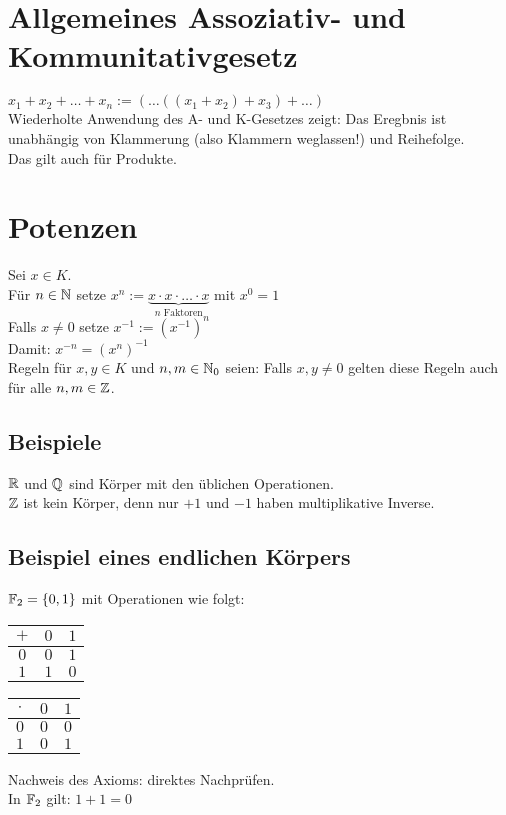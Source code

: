 \fancyhead[R]{}
{}
\section*{Allgemeines Assoziativ- und Kommunitativgesetz}
$x_1+x_2+\hdots+x_n := (\hdots((x_1+x_2)+x_3)+\hdots)$\\
Wiederholte Anwendung des A- und K-Gesetzes zeigt: Das Eregbnis ist unabhängig von Klammerung (also Klammern weglassen!) und Reihefolge.\\
Das gilt auch für Produkte.

\section*{Potenzen}
Sei $x \in K$.\\
Für $n \in \mathbb{N}$ setze $x^n := \underbrace{x \cdot x \cdot \hdots \cdot x}_{n \text{ Faktoren}}$ mit $x^0=1$\\
Falls $x \neq 0$ setze $x^{-1} := (x^{-1})^n$\\
Damit: $x^{-n} = (x^n)^{-1}$\\
Regeln für $x,y \in K$ und $n,m \in \mathbb{N}_0$ seien:
Falls $x,y \neq 0$ gelten diese Regeln auch für alle $n,m \in \mathbb{Z}$.

\subsection*{Beispiele}
$\mathbb{R}$ und $\mathbb{Q}$ sind Körper mit den üblichen Operationen.\\
$\mathbb{Z}$ ist kein Körper, denn nur $+1$ und $-1$ haben multiplikative Inverse.

\subsection*{Beispiel eines endlichen Körpers}\label{BspEndlKoerper}
$\mathbb{F}_2=\{0,1\}$ mit Operationen wie folgt:\nl
\begin{tabular}{c|c|c}
$+$ & $0$ & $1$ \\ 
\hline 
$0$ & $0$ & $1$\\
$1$ & $1$ & $0$
\end{tabular}\hspace{5em}
\begin{tabular}{c|c|c}
$\cdot$ & $0$ & $1$ \\ 
\hline 
$0$ & $0$ & $0$\\
$1$ & $0$ & $1$
\end{tabular}\nl
Nachweis des Axioms: direktes Nachprüfen.\\
In $\mathbb{F}_2$ gilt: $1+1=0$

